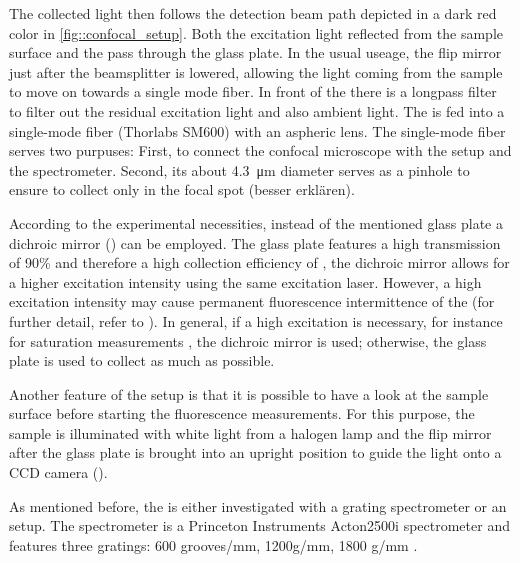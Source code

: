 	The collected light then follows the detection beam path depicted in a dark red color in \autoref{fig::confocal_setup}.
	Both the excitation light reflected from the sample surface and the \fl pass through the glass plate.
	In the usual useage, the flip mirror just after the beamsplitter is lowered, allowing the light coming from the sample to move on towards a single mode fiber. 
	In front of the \smf there is a longpass filter to filter out the residual excitation light and also ambient light.
	The \fl is fed into a single-mode fiber (Thorlabs SM600) with an aspheric lens.
	The single-mode fiber serves two purpuses: First, to connect the confocal microscope with the \hbt setup and the spectrometer.
	Second, its about \SI{4.3}{\micro\meter} diameter serves as a pinhole to ensure to collect only \fl in the focal spot \todo(besser erklären).

	According to the experimental necessities, instead of the mentioned glass plate a dichroic mirror () can be employed.
	The glass plate features a high transmission of 90\%  and therefore a high collection efficiency of \fl, the dichroic mirror allows for a higher excitation intensity using the same excitation laser. 
	However, a high excitation intensity may cause permanent fluorescence intermittence of the \sivs (for further detail, refer to ).
	In general, if a high excitation is necessary, for instance for saturation measurements , the dichroic mirror is used; otherwise, the glass plate is used to collect as much \fl as possible.

	Another feature of the setup is that it is possible to have a look at the sample surface before starting the fluorescence measurements.
	For this purpose, the sample is illuminated with white light from a halogen lamp and the flip mirror after the glass plate is brought into an upright position to guide the light onto a CCD camera ().

	As mentioned before, the \fl is either investigated with a grating spectrometer or an \hbt setup.
	The spectrometer is a Princeton Instruments Acton2500i  spectrometer and features three gratings: 600 grooves/mm, 1200g/mm, 1800 g/mm .




